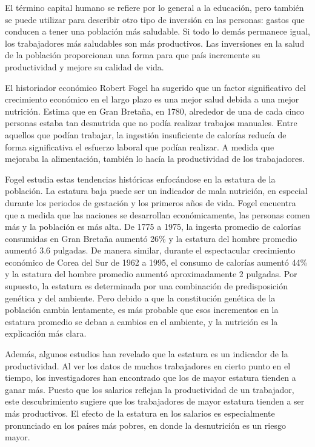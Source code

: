 \documentclass[
]{krantz}
\begin{document}
El término capital humano se refiere por lo general a la educación, pero también se puede utilizar para describir otro tipo de inversión en las personas: gastos que conducen a tener una población más saludable. Si todo lo demás permanece igual, los trabajadores más saludables son más productivos. Las inversiones en la salud de la población proporcionan una forma para que país incremente su productividad y mejore su calidad de vida.

El historiador económico Robert Fogel ha sugerido que un factor significativo del crecimiento económico en el largo plazo es una mejor salud debida a una mejor nutrición. Estima que en Gran Bretaña, en 1780, alrededor de una de cada cinco personas estaba tan desnutrida que no podía realizar trabajos manuales. Entre aquellos que podían trabajar, la ingestión insuficiente de calorías reducía de forma significativa el esfuerzo laboral que podían realizar. A medida que mejoraba la alimentación, también lo hacía la productividad de los trabajadores.

Fogel estudia estas tendencias históricas enfocándose en la estatura de la población. La estatura baja puede ser un indicador de mala nutrición, en especial durante los periodos de gestación y los primeros años de vida. Fogel encuentra que a medida que las naciones se desarrollan económicamente, las personas comen más y la población es más alta. De 1775 a 1975, la ingesta promedio de calorías consumidas en Gran Bretaña aumentó 26\% y la estatura del hombre promedio aumentó 3.6 pulgadas. De manera similar, durante el espectacular crecimiento económico de Corea del Sur de 1962 a 1995, el consumo de calorías aumentó 44\% y la estatura del hombre promedio aumentó aproximadamente 2 pulgadas. Por supuesto, la estatura es determinada por una combinación de predisposición genética y del ambiente. Pero debido a que la constitución genética de la población cambia lentamente, es más probable que esos incrementos en la estatura promedio se deban a cambios en el ambiente, y la nutrición es la explicación más clara.

Además, algunos estudios han revelado que la estatura es un indicador de la productividad. Al ver los datos de muchos trabajadores en cierto punto en el tiempo, los investigadores han encontrado que los de mayor estatura tienden a ganar más. Puesto que los salarios reflejan la productividad de un trabajador, este descubrimiento sugiere que los trabajadores de mayor estatura tienden a ser más productivos. El efecto de la estatura en los salarios es especialmente pronunciado en los países más pobres, en donde la desnutrición es un riesgo mayor.
\end{document}
